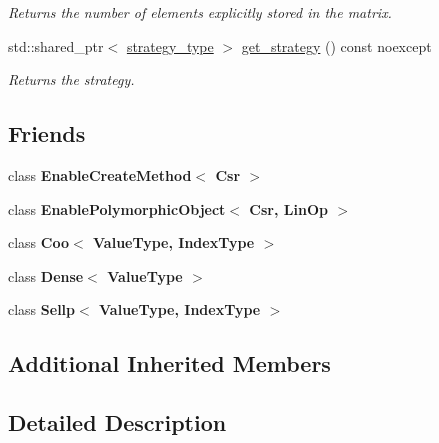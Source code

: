 \begin{DoxyCompactItemize}
\begin{DoxyCompactList}\small\item\em Returns the number of elements explicitly stored in the matrix. \end{DoxyCompactList}\item 
std\+::shared\+\_\+ptr$<$ \hyperlink{classgko_1_1matrix_1_1Csr_1_1strategy__type}{strategy\+\_\+type} $>$ \hyperlink{classgko_1_1matrix_1_1Csr_ada0db14e65dfe027f483dc449f704a7e}{get\+\_\+strategy} () const noexcept
\begin{DoxyCompactList}\small\item\em Returns the strategy. \end{DoxyCompactList}\end{DoxyCompactItemize}
\subsection*{Friends}
\begin{DoxyCompactItemize}
\item 
\mbox{\label{classgko_1_1matrix_1_1Csr_ad8cd96663ce0ef68ea6d54f3d163df35}} 
class {\bfseries Enable\+Create\+Method$<$ Csr $>$}
\item 
\mbox{\label{classgko_1_1matrix_1_1Csr_a6fa2ee2c326608dac42afed82be6713c}} 
class {\bfseries Enable\+Polymorphic\+Object$<$ Csr, Lin\+Op $>$}
\item 
\mbox{\label{classgko_1_1matrix_1_1Csr_ad2572ffab980b4728254b155909b3119}} 
class {\bfseries Coo$<$ Value\+Type, Index\+Type $>$}
\item 
\mbox{\label{classgko_1_1matrix_1_1Csr_a22a84c8f67f946aa60a2fa8bf5835a32}} 
class {\bfseries Dense$<$ Value\+Type $>$}
\item 
\mbox{\label{classgko_1_1matrix_1_1Csr_a400cb6dae6e6294b9f7d0249d63d538c}} 
class {\bfseries Sellp$<$ Value\+Type, Index\+Type $>$}
\end{DoxyCompactItemize}
\subsection*{Additional Inherited Members}


\subsection{Detailed Description}
